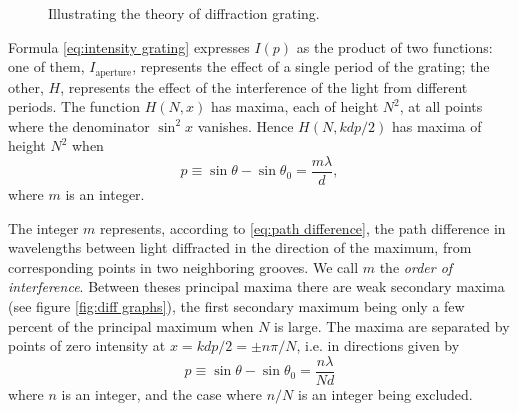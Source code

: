 \documentclass[12pt,twoside,english]{book}
\renewcommand{\~}{\perispomeni}%
\numberwithin{equation}{section}
\numberwithin{figure}{section}
\begin{document}
\begin{figure}
\centering
\caption{Illustrating the theory of diffraction grating.}
\label{fig:grating ray}
\end{figure}

Formula \ref{eq:intensity grating} expresses $I\left(p\right)$ as the product of two functions: one of them, $I_{\text{aperture}}$, represents the effect of a single period of the grating; the other, $H$, represents the effect of the interference of the light from different periods. The function $H\left(N,x\right)$ has maxima, each of height $N^{2}$, at all points where the denominator $\sin^2 x$ vanishes. Hence $H\left(N,kdp/2\right)$ has maxima of height $N^2$ when
\begin{equation}
p\equiv\sin\theta-\sin\theta_{0}=\frac{m\lambda}{d},
\label{eq:grating equation}
\end{equation}
where $m$ is an integer.

The integer $m$ represents, according to \ref{eq:path difference}, the path difference in wavelengths between light diffracted in the direction of the maximum, from corresponding points in two neighboring grooves. We call $m$ the \emph{order of interference}. Between theses principal maxima there are weak secondary maxima (see figure \ref{fig:diff graphs}), the first secondary maximum being only a few percent of the principal maximum when $N$ is large. The maxima are separated by points of zero intensity at $x=kdp/2=\pm n\pi/N$, i.e. in directions given by
\begin{equation}
p\equiv\sin\theta-\sin\theta_{0}=\frac{n\lambda}{Nd}
\label{eq: grating secondary maxima}
\end{equation}
where $n$ is an integer, and the case where $n/N$ is an integer being excluded.
\end{document}
